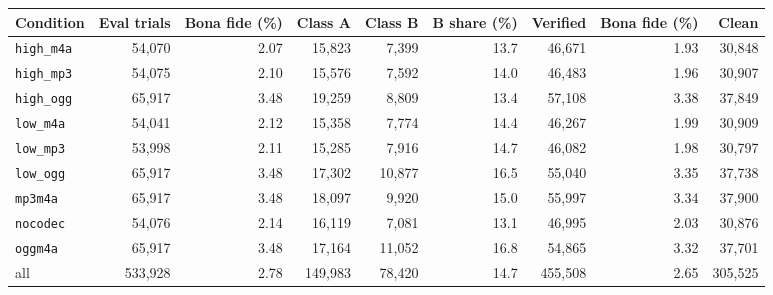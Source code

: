 \begin{tabular}{@{}lrrrrrrrr@{}}
\toprule
Condition & Eval trials & Bona fide (\%) & Class A & Class B & B share (\%) & Verified & Bona fide (\%) & Clean \\
\midrule
\texttt{high\_m4a} & 54,070 & 2.07 & 15,823 & 7,399 & 13.7 & 46,671 & 1.93 & 30,848 \\
\texttt{high\_mp3} & 54,075 & 2.10 & 15,576 & 7,592 & 14.0 & 46,483 & 1.96 & 30,907 \\
\texttt{high\_ogg} & 65,917 & 3.48 & 19,259 & 8,809 & 13.4 & 57,108 & 3.38 & 37,849 \\
\texttt{low\_m4a} & 54,041 & 2.12 & 15,358 & 7,774 & 14.4 & 46,267 & 1.99 & 30,909 \\
\texttt{low\_mp3} & 53,998 & 2.11 & 15,285 & 7,916 & 14.7 & 46,082 & 1.98 & 30,797 \\
\texttt{low\_ogg} & 65,917 & 3.48 & 17,302 & 10,877 & 16.5 & 55,040 & 3.35 & 37,738 \\
\texttt{mp3m4a} & 65,917 & 3.48 & 18,097 & 9,920 & 15.0 & 55,997 & 3.34 & 37,900 \\
\texttt{nocodec} & 54,076 & 2.14 & 16,119 & 7,081 & 13.1 & 46,995 & 2.03 & 30,876 \\
\texttt{oggm4a} & 65,917 & 3.48 & 17,164 & 11,052 & 16.8 & 54,865 & 3.32 & 37,701 \\
\midrule
all & 533,928 & 2.78 & 149,983 & 78,420 & 14.7 & 455,508 & 2.65 & 305,525 \\
\bottomrule
\end{tabular}
